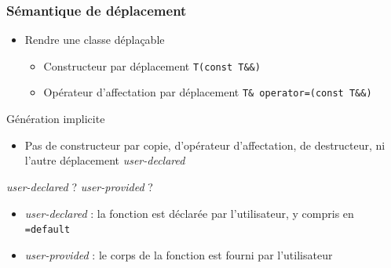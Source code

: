 \documentclass[C++.tex]{subfiles}
\begin{document}
\begin{frame}
	\frametitle{Sémantique de déplacement}
	\begin{itemize}
		\item Rendre une classe déplaçable
		\begin{itemize}
			\item Constructeur par déplacement \lstinline|T(const T&&)|
			\item Opérateur d'affectation par déplacement \lstinline|T& operator=(const T&&)|
		\end{itemize}
	\end{itemize}

	\begin{block}{Génération implicite}
		\begin{itemize}
			\item Pas de constructeur par copie, d'opérateur d'affectation, de destructeur, ni l'autre déplacement \textit{user-declared}
		\end{itemize}
	\end{block}
		
	\begin{alertblock}{\textit{user-declared} ? \textit{user-provided} ?}
		\begin{itemize}
			\item \textit{user-declared} : la fonction est déclarée par l'utilisateur, y compris en \lstinline|=default| 
			\item \textit{user-provided} : le corps de la fonction est fourni par l'utilisateur

		\end{itemize}
	\end{alertblock}
\end{frame}
\end{document}
